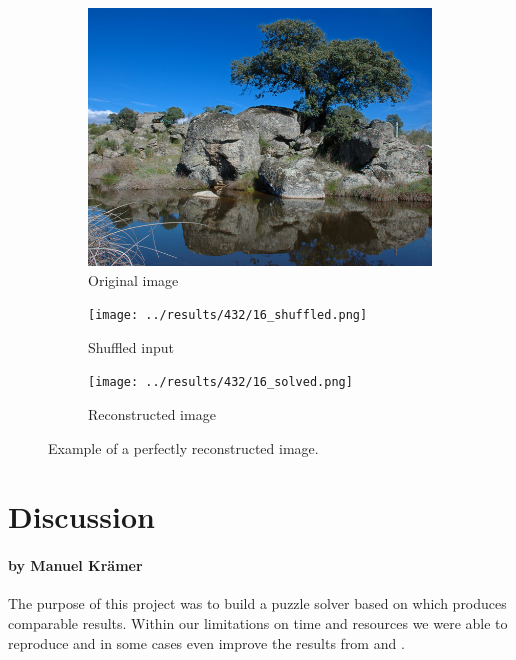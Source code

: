 \documentclass[11pt]{report}
\begin{document}
\begin{figure}
  \centering
  \begin{subfigure}{0.45\textwidth}
    \includegraphics[width=\textwidth]{../imData/432/16.png}
		\caption{Original image}
		\label{img:432_8}
	\end{subfigure}
  \begin{subfigure}{0.45\textwidth}
  \texttt{[image: ../results/432/16\_shuffled.png]}
		\caption{Shuffled input}
		\label{img:432:16_shuffled}
	\end{subfigure}
  \begin{subfigure}{0.45\textwidth}
  \texttt{[image: ../results/432/16\_solved.png]}
		\caption{Reconstructed image}
		\label{img:432:16_solved}
	\end{subfigure}
  \caption{Example of a perfectly reconstructed image.}
  \label{fig:success}
\end{figure}

\chapter{Discussion}
\subsubsection*{by Manuel Krämer}

The purpose of this project was to build a puzzle solver based on \cite{Paikin2015} which produces comparable results. Within our limitations on time and resources we were able to reproduce and in some cases even improve the results from \cite{Paikin2015} and \cite{Pomeranz2011}.
\end{document}
